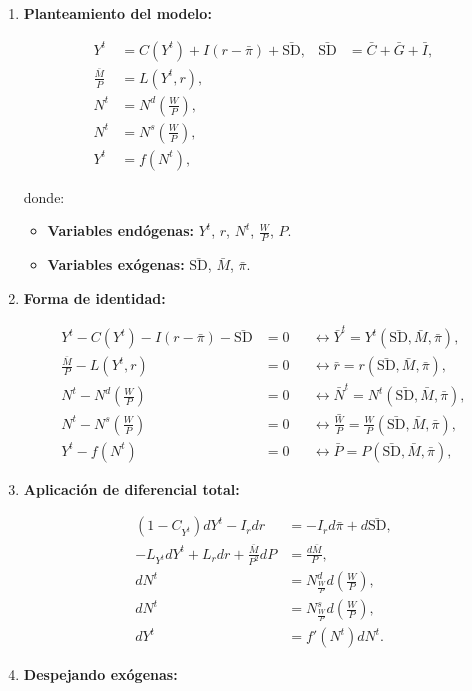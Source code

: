 \documentclass[
  doc,
  floatsintext,
  longtable,
  a4paper,
  nolmodern,
  notxfonts,
  notimes,
  12pt,
  colorlinks=true,linkcolor=blue,citecolor=blue,urlcolor=blue]{apa7}
\providecommand{\tightlist}{%
  \setlength{\itemsep}{0pt}\setlength{\parskip}{0pt}}
\begin{document}
\begin{enumerate}
\def\labelenumi{\arabic{enumi}.}
\item
  \textbf{Planteamiento del modelo:}

  \[
  \begin{aligned}
  Y^t &= C(Y^t) + I(r - \bar{\pi}) + \bar{\mathrm{SD}}, & \bar{\mathrm{SD}} &= \bar{C} + \bar{G} + \bar{I}, \\
  \frac{\bar{M}}{P} &= L(Y^t, r), \\
  N^t &= N^d \left( \frac{W}{P} \right), \\
  N^t &= N^s \left( \frac{W}{P} \right), \\
  Y^t &= f(N^t),
  \end{aligned}
  \]

  donde:

  \begin{itemize}
  \tightlist
  \item
    \textbf{Variables endógenas:} \(Y^t\), \(r\), \(N^t\),
    \(\frac{W}{P}\), \(P\).
  \item
    \textbf{Variables exógenas:} \(\bar{\mathrm{SD}}\), \(\bar{M}\),
    \(\bar{\pi}\).
  \end{itemize}
\item
  \textbf{Forma de identidad:}

  \[
  \begin{aligned}
  Y^t - C(Y^t) - I(r - \bar{\pi}) - \bar{\mathrm{SD}} &= 0 & &\leftrightarrow \bar{Y}^t = Y^t(\bar{\mathrm{SD}}, \bar{M}, \bar{\pi}), \\
  \frac{\bar{M}}{P} - L(Y^t, r) &= 0 & &\leftrightarrow \bar{r} = r(\bar{\mathrm{SD}}, \bar{M}, \bar{\pi}), \\
  N^t - N^d \left( \frac{W}{P} \right) &= 0 & &\leftrightarrow \bar{N}^t = N^t(\bar{\mathrm{SD}}, \bar{M}, \bar{\pi}), \\
  N^t - N^s \left( \frac{W}{P} \right) &= 0 & &\leftrightarrow \bar{\frac{W}{P}} = \frac{W}{P}(\bar{\mathrm{SD}}, \bar{M}, \bar{\pi}), \\
  Y^t - f(N^t) &= 0 & &\leftrightarrow \bar{P} = P(\bar{\mathrm{SD}}, \bar{M}, \bar{\pi}),
  \end{aligned}
  \]
\item
  \textbf{Aplicación de diferencial total:}

  \[
  \begin{aligned}
  (1 - C_{Y^t}) dY^t - I_r dr &= -I_r d\bar{\pi} + d\bar{\mathrm{SD}}, \\
  -L_{Y^t} dY^t + L_r dr + \frac{\bar{M}}{P^2} dP &= \frac{d\bar{M}}{P}, \\
  dN^t &= N^d_{\frac{W}{P}} d \left( \frac{W}{P} \right), \\
  dN^t &= N^s_{\frac{W}{P}} d \left( \frac{W}{P} \right), \\
  dY^t &= f'(N^t) dN^t.
  \end{aligned}
  \]
\item
  \textbf{Despejando exógenas:}


\end{enumerate}
\end{document}
